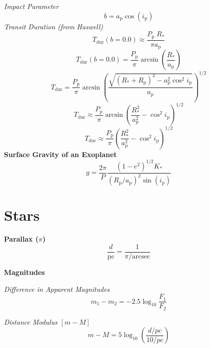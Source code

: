 \documentclass{spy}
\begin{document}
\textit{Impact Parameter}
\begin{equation}
b = a_\mathrm{p} \cos(i_\mathrm{p})
\end{equation}
\textit{Transit Duration (from Haswell)}
\begin{equation}
T_\mathrm{dur}(b = 0.0) \approx \frac{P_\mathrm{p} \; R_\mathrm{*}}{\pi a_\mathrm{p}}
\end{equation}
\begin{equation}
T_\mathrm{dur}(b = 0.0) =  \frac{P_\mathrm{p}}{\pi} \arcsin \left( \frac{R_\mathrm{*}}{a_\mathrm{p}} \right)
\end{equation}
\begin{equation}
T_\mathrm{dur} =  \frac{P_\mathrm{p}}{\pi} \arcsin \left( \frac{\sqrt{(R_\mathrm{*}+R_\mathrm{p})^2 - a_\mathrm{p}^2 \cos^2 i_\mathrm{p}}}{a_\mathrm{p}} \right)^{1/2}
\end{equation}
\begin{equation}
T_\mathrm{dur} \approx  \frac{P_\mathrm{p}}{\pi} \arcsin \left( \frac{R_\mathrm{*}^2}{a_\mathrm{p}^2} - \cos^2 i_\mathrm{p} \right)^{1/2}
\end{equation}
\begin{equation}
T_\mathrm{dur} \approx  \frac{P_\mathrm{p}}{\pi} \left( \frac{R_\mathrm{*}^2}{a_\mathrm{p}^2} - \cos^2 i_\mathrm{p} \right)^{1/2}
\end{equation}
\textbf {Surface Gravity of an Exoplanet}
\begin{equation}
g = \frac{2 \pi}{P} \frac{(1-e^2)^{1/2} K_\mathrm{*}}{(R_\mathrm{p}/a_\mathrm{p})^2 \sin(i_\mathrm{p})}
\end{equation}
\newpage

\section {Stars}
\textbf {Parallax (\(\pi\))}
\begin{equation}
\frac{d}{\mathrm{pc}} = \frac{1}{\pi / \mathrm{arcsec}}
\end{equation}


\textbf {Magnitudes}

\textit {Difference in Apparent Magnitudes}
\begin{equation}
m_\mathrm{1} - m_\mathrm{2} = -2.5 \log _{10} \frac {F_\mathrm{1}}{F_\mathrm{2}}
\end{equation}

\textit {Distance Modulus \(\left[ m - M \right]\)}
\begin{equation}
m - M = 5 \log _\mathrm{10} \left( \frac {d / pc} {10 / pc} \right)
\end{equation}
\end{document}
